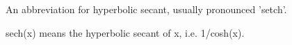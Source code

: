 An abbreviation for hyperbolic secant, usually pronounced 'setch'.
\par
sech(x) means the hyperbolic secant of x, i.e. 1/cosh(x).
